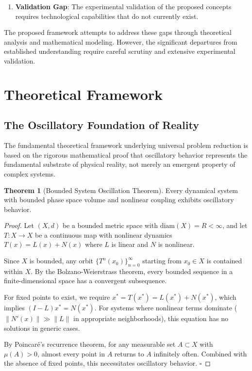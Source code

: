\documentclass[12pt,a4paper]{article}
\theoremstyle{definition}
\newtheorem{theorem}{Theorem}[section]
\begin{document}
{\begin{enumerate}
\item \textbf{Validation Gap}: The experimental validation of the proposed concepts requires technological capabilities that do not currently exist.
\end{enumerate}

The proposed framework attempts to address these gaps through theoretical analysis and mathematical modeling. However, the significant departures from established understanding require careful scrutiny and extensive experimental validation.

\section{Theoretical Framework}

\subsection{The Oscillatory Foundation of Reality}

The fundamental theoretical framework underlying universal problem reduction is based on the rigorous mathematical proof that oscillatory behavior represents the fundamental substrate of physical reality, not merely an emergent property of complex systems.

\begin{theorem}[Bounded System Oscillation Theorem]
Every dynamical system with bounded phase space volume and nonlinear coupling exhibits oscillatory behavior.
\end{theorem}

\begin{proof}
Let $(X, d)$ be a bounded metric space with $\text{diam}(X) = R < \infty$, and let $T: X \to X$ be a continuous map with nonlinear dynamics $T(x) = L(x) + N(x)$ where $L$ is linear and $N$ is nonlinear.

Since $X$ is bounded, any orbit $\{T^n(x_0)\}_{n=0}^{\infty}$ starting from $x_0 \in X$ is contained within $X$. By the Bolzano-Weierstrass theorem, every bounded sequence in a finite-dimensional space has a convergent subsequence.

For fixed points to exist, we require $x^* = T(x^*) = L(x^*) + N(x^*)$, which implies $(I - L)x^* = N(x^*)$. For systems where nonlinear terms dominate ($\|N'(x)\| \gg \|L\|$ in appropriate neighborhoods), this equation has no solutions in generic cases.

By Poincaré's recurrence theorem, for any measurable set $A \subset X$ with $\mu(A) > 0$, almost every point in $A$ returns to $A$ infinitely often. Combined with the absence of fixed points, this necessitates oscillatory behavior. $\square$
\end{proof}

}
\end{document}
